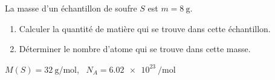 La masse d'un échantillon de soufre $S$ est $m=\qty{8}{\g}$.
\begin{enumerate}
    \item Calculer la quantité de matière qui se trouve dans cette
          échantillon.
    \item Déterminer le nombre d'atome qui se trouve dans cette masse.
\end{enumerate}

\begin{donnees}
$M(S)=\qty{32}{\g\per\mol}$, \ $N_A=\qty{6.02e23}{\per\mol}$
\end{donnees}
